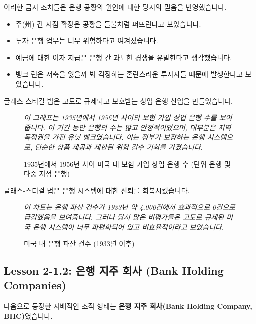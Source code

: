 \documentclass[11pt,a4paper]{book}
\theoremstyle{definition}
\begin{document}
이러한 금지 조치들은 은행 공황의 원인에 대한 당시의 믿음을 반영했습니다.
\begin{itemize}
    \item 주(州) 간 지점 확장은 공황을 들불처럼 퍼뜨린다고 보았습니다.
    \item 투자 은행 업무는 너무 위험하다고 여겨졌습니다.
    \item 예금에 대한 이자 지급은 은행 간 과도한 경쟁을 유발한다고 생각했습니다.
    \item 뱅크 런은 저축을 잃을까 봐 걱정하는 혼란스러운 투자자들 때문에 발생한다고 보았습니다.
\end{itemize}
글래스-스티걸 법은 고도로 규제되고 보호받는 상업 은행 산업을 만들었습니다.

\begin{figure}[h!]
    \centering
    \caption{1935년에서 1956년 사이 미국 내 보험 가입 상업 은행 수 (단위 은행 및 다중 지점 은행)}
    \label{fig:banks_1935_1956}
    \textit{이 그래프는 1935년에서 1956년 사이의 보험 가입 상업 은행 수를 보여줍니다. 이 기간 동안 은행의 수는 많고 안정적이었으며, 대부분은 지역 독점권을 가진 유닛 뱅크였습니다. 이는 정부가 보장하는 은행 시스템으로, 단순한 상품 제공과 제한된 위험 감수 기회를 가졌습니다.}
\end{figure}

글래스-스티걸 법은 은행 시스템에 대한 신뢰를 회복시켰습니다.

\begin{figure}[h!]
    \centering
    \caption{미국 내 은행 파산 건수 (1933년 이후)}
    \label{fig:bank_failures}
    \textit{이 차트는 은행 파산 건수가 1933년 약 4,000건에서 효과적으로 0건으로 급감했음을 보여줍니다. 그러나 당시 많은 비평가들은 고도로 규제된 미국 은행 시스템이 너무 파편화되어 있고 비효율적이라고 보았습니다.}
\end{figure}


\subsection{Lesson 2-1.2: 은행 지주 회사 (Bank Holding Companies)}

다음으로 등장한 지배적인 조직 형태는 \textbf{은행 지주 회사(Bank Holding Company, BHC)}였습니다.
\end{document}
